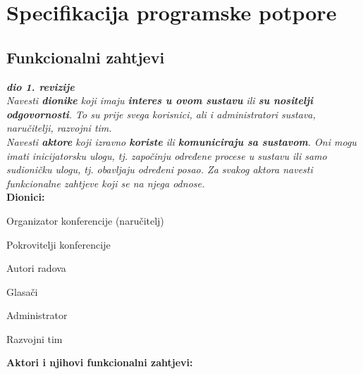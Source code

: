 \chapter{Specifikacija programske potpore}
		
	\section{Funkcionalni zahtjevi}
			
			\textbf{\textit{dio 1. revizije}}\\
			
			\textit{Navesti \textbf{dionike} koji imaju \textbf{interes u ovom sustavu} ili  \textbf{su nositelji odgovornosti}. To su prije svega korisnici, ali i administratori sustava, naručitelji, razvojni tim.}\\
				
			\textit{Navesti \textbf{aktore} koji izravno \textbf{koriste} ili \textbf{komuniciraju sa sustavom}. Oni mogu imati inicijatorsku ulogu, tj. započinju određene procese u sustavu ili samo sudioničku ulogu, tj. obavljaju određeni posao. Za svakog aktora navesti funkcionalne zahtjeve koji se na njega odnose.}\\
			
			
			\noindent \textbf{Dionici:}
			
			\begin{packed_enum}
				
				\item Organizator konferencije (naručitelj)
				\item Pokrovitelji konferencije
				\item Autori radova
				\item Glasači
				\item Administrator
				\item Razvojni tim
				
			\end{packed_enum}
			
			\noindent \textbf{Aktori i njihovi funkcionalni zahtjevi:}
			
